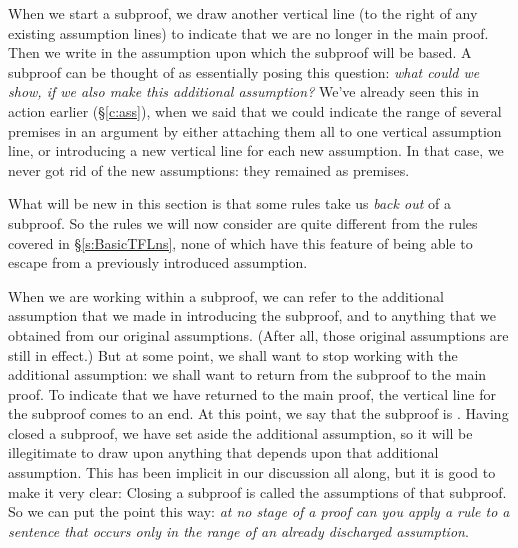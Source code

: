 When we start a subproof, we draw another vertical line (to the right of any existing assumption lines) to indicate that we are no longer in the main proof. Then we write in the assumption upon which the subproof will be based. A subproof can be thought of as essentially posing this question: \emph{what could we show, if we also make this additional assumption?} We've already seen this in action earlier (§\ref{c:ass}), when we said that we could indicate the range of several premises in an argument by either attaching them all to one vertical assumption line, or introducing a new vertical line for each new assumption. In that case, we never got rid of the new assumptions: they remained as premises. 

What will be new in this section is that some rules take us \emph{back out} of a subproof. So the rules we will now consider are quite different from the rules covered in §\ref{s:BasicTFLns}, none of which have this feature of being able to escape from a previously introduced assumption.

When we are working within a subproof, we can refer to the additional assumption that we made in introducing the subproof, and to anything that we obtained from our original assumptions. (After all, those original assumptions are still in effect.) But at some point, we shall want to stop working with the additional assumption: we shall want to return from the subproof to the main proof. To indicate that we have returned to the main proof, the vertical line for the subproof comes to an end. At this point, we say that the subproof is . Having closed a subproof, we have set aside the additional assumption, so it will be illegitimate to draw upon anything that depends upon that additional assumption. This has been implicit in our discussion all along, but it is good to make it very clear:
Closing a subproof is called  the assumptions of that subproof. So we can put the point this way: \emph{at no stage of a proof can you apply a rule to a sentence that occurs only in the range of an already discharged assumption}. 

